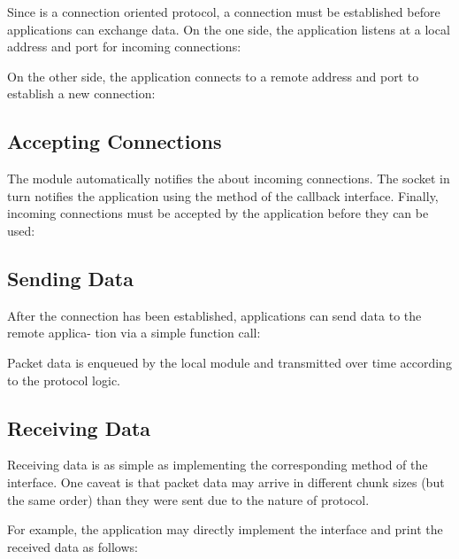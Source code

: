 Since  is a connection oriented protocol, a connection must be
established before applications can exchange data. On the one side, the
application listens at a local address and port for incoming 
connections:


On the other side, the application connects to a remote address and port to
establish a new connection:


\subsection*{Accepting Connections}

The  module automatically notifies the  about
incoming connections. The socket in turn notifies the application using the
 method of the callback interface. Finally,
incoming  connections must be accepted by the application before
they can be used:


\subsection*{Sending Data}

After the connection has been established, applications can send data to the
remote applica- tion via a simple function call:


Packet data is enqueued by the local  module and transmitted over
time according to the protocol logic.

\subsection*{Receiving Data}

Receiving data is as simple as implementing the corresponding method of the
 interface. One caveat is that packet data may
arrive in different chunk sizes (but the same order) than they were sent due to
the nature of  protocol.

For example, the application may directly implement the
 interface and print the received data as
follows:

